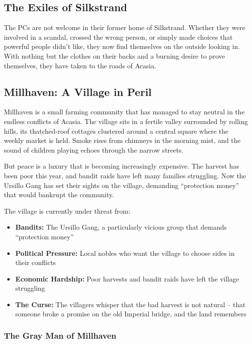 \documentclass[11pt]{article}
\begin{document}
\subsection{The Exiles of Silkstrand}

The PCs are not welcome in their former home of Silkstrand. Whether they were involved in a scandal, crossed the wrong person, or simply made choices that powerful people didn't like, they now find themselves on the outside looking in. With nothing but the clothes on their backs and a burning desire to prove themselves, they have taken to the roads of Acasia.

\subsection{Millhaven: A Village in Peril}

Millhaven is a small farming community that has managed to stay neutral in the endless conflicts of Acasia. The village sits in a fertile valley surrounded by rolling hills, its thatched-roof cottages clustered around a central square where the weekly market is held. Smoke rises from chimneys in the morning mist, and the sound of children playing echoes through the narrow streets.

But peace is a luxury that is becoming increasingly expensive. The harvest has been poor this year, and bandit raids have left many families struggling. Now the Ursillo Gang has set their sights on the village, demanding ``protection money'' that would bankrupt the community.

The village is currently under threat from:
\begin{itemize}
\item \textbf{Bandits:} The Ursillo Gang, a particularly vicious group that demands ``protection money''
\item \textbf{Political Pressure:} Local nobles who want the village to choose sides in their conflicts
\item \textbf{Economic Hardship:} Poor harvests and bandit raids have left the village struggling
\item \textbf{The Curse:} The villagers whisper that the bad harvest is not natural -- that someone broke a promise on the old Imperial bridge, and the land remembers
\end{itemize}

\subsubsection{The Gray Man of Millhaven}
\end{document}
